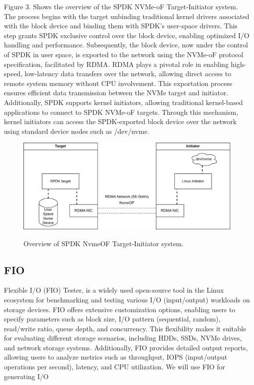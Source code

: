 Figure 3. Shows the overview of the SPDK NVMe-oF Target-Initiator system. The process begins with the target unbinding traditional kernel drivers associated with the block device and binding them with SPDK's user-space drivers. This step grants SPDK exclusive control over the block device, enabling optimized I/O handling and performance. Subsequently, the block device, now under the control of SPDK in user space, is exported to the network using the NVMe-oF protocol specification, facilitated by RDMA. RDMA plays a pivotal role in enabling high-speed, low-latency data transfers over the network, allowing direct access to remote system memory without CPU involvement. This exportation process ensures efficient data transmission between the NVMe target and initiator. Additionally, SPDK supports kernel initiators, allowing traditional kernel-based applications to connect to SPDK NVMe-oF targets. Through this mechanism, kernel initiators can access the SPDK-exported block device over the network using standard device nodes such as /dev/nvme.
\begin{figure}[h]
\includegraphics[scale=0.25]{figures/spdk-target.png}\\
\caption{Overview of SPDK NvmeOF Target-Initiator system.}
\end{figure}

\vspace{8em}
\subsection{FIO}
Flexible I/O (FIO) Tester, is a widely used open-source tool in the
Linux ecosystem for benchmarking and testing various I/O (input/output)
workloads on storage devices. FIO offers extensive customization options,
enabling users to specify parameters such as block size, I/O pattern
(sequential, random), read/write ratio, queue depth, and concurrency. This
flexibility makes it suitable for evaluating different storage scenarios,
including HDDs, SSDs, NVMe drives, and network storage systems. Additionally,
FIO provides detailed output reports, allowing users to analyze metrics such as
throughput, IOPS (input/output operations per second), latency, and CPU
utilization. We will use FIO for generating I/O 
\vspace{1em}
